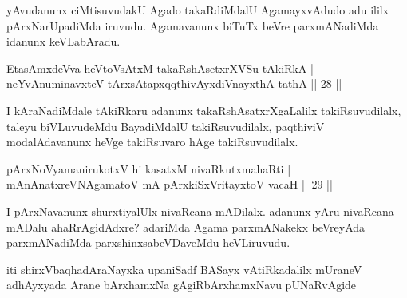 \begin{artha}
yAvudanunx ciMtisuvudakU Agado takaRdiMdalU AgamayxvAdudo adu ililx pArxNarUpadiMda iruvudu. Agamavanunx biTuTx beVre parxmANadiMda idanunx keVLabAradu.
\end{artha}

\begin{shl}
EtasAmxdeVva heVtoVsAtxM takaRshAsetxrXVSu tAkiRkA |\\
neYvAnuminavxteV tArxsAtapxqqthivAyxdiVnayxthA tathA \hfill || 28 ||
\end{shl}

\begin{artha}%
I kAraNadiMdale tAkiRkaru adanunx takaRshAsatxrXgaLalilx takiRsuvudilalx, taleyu biVLuvudeMdu BayadiMdalU takiRsuvudilalx, paqthiviV modalAdavanunx heVge takiRsuvaro hAge takiRsuvudilalx.
\end{artha}

\begin{shl}
pArxNoV\s yamanirukotxV hi kasatxM nivaRkutxmahaRti |\\
mAnAnatxreVNA\s \s gamatoV mA pArxkiSxVritayxtoV vacaH \hfill || 29 ||
\end{shl}

\begin{artha}
I pArxNavanunx shurxtiyalUlx nivaRcana mADilalx. adanunx yAru nivaRcana mADalu ahaRrAgidAdxre? adariMda Agama parxmANakekx beVreyAda parxmANadiMda parxshinxsabeVDaveMdu heVLiruvudu.
\end{artha}

\begin{center}
iti shirxVbaqhadAraNayxka upaniSadf BASayx vAtiRkadalilx mUraneV adhAyxyada Arane bArxhamxNa gAgiRbArxhamxNavu pUNaRvAgide
\end{center}
